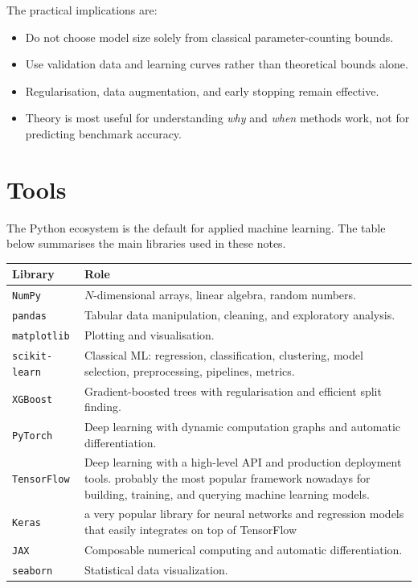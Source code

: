 \documentclass[a4paper, 12pt]{book}
\begin{document}
The practical implications are:
\begin{itemize}
    \item Do not choose model size solely from classical parameter-counting bounds.
    \item Use validation data and learning curves rather than theoretical bounds alone.
    \item Regularisation, data augmentation, and early stopping remain effective.
    \item Theory is most useful for understanding \emph{why} and \emph{when} methods
    work, not for predicting benchmark accuracy.
\end{itemize}


\chapter{Tools}
\label{ch:tools}

The Python ecosystem is the default for applied machine learning. The table below summarises the main libraries used in these notes.

\begin{center}
\renewcommand{\arraystretch}{1.25}
\begin{tabularx}{\textwidth}{@{}l>{\raggedright\arraybackslash}X@{}}
\toprule
Library & Role \\
\midrule
\texttt{NumPy} & $N$-dimensional arrays, linear algebra, random numbers. \\
\texttt{pandas} & Tabular data manipulation, cleaning, and exploratory analysis. \\
\texttt{matplotlib} & Plotting and visualisation. \\
\texttt{scikit-learn} & Classical ML: regression, classification, clustering, model selection,
preprocessing, pipelines, metrics. \\
\texttt{XGBoost} & Gradient-boosted trees with regularisation and efficient split finding. \\
\texttt{PyTorch} & Deep learning with dynamic computation graphs and automatic differentiation. \\
\texttt{TensorFlow} & Deep learning with a high-level API and production deployment tools. probably the most popular framework
nowadays for building, training, and querying machine
learning models. \\
\texttt{Keras} & a very popular library for neural networks
and regression models that easily integrates on top of
TensorFlow \\ 
\texttt{JAX} & Composable numerical computing and automatic differentiation. \\
\texttt{seaborn} & Statistical data visualization. \\
\bottomrule
\end{tabularx}
\end{center}
\end{document}
